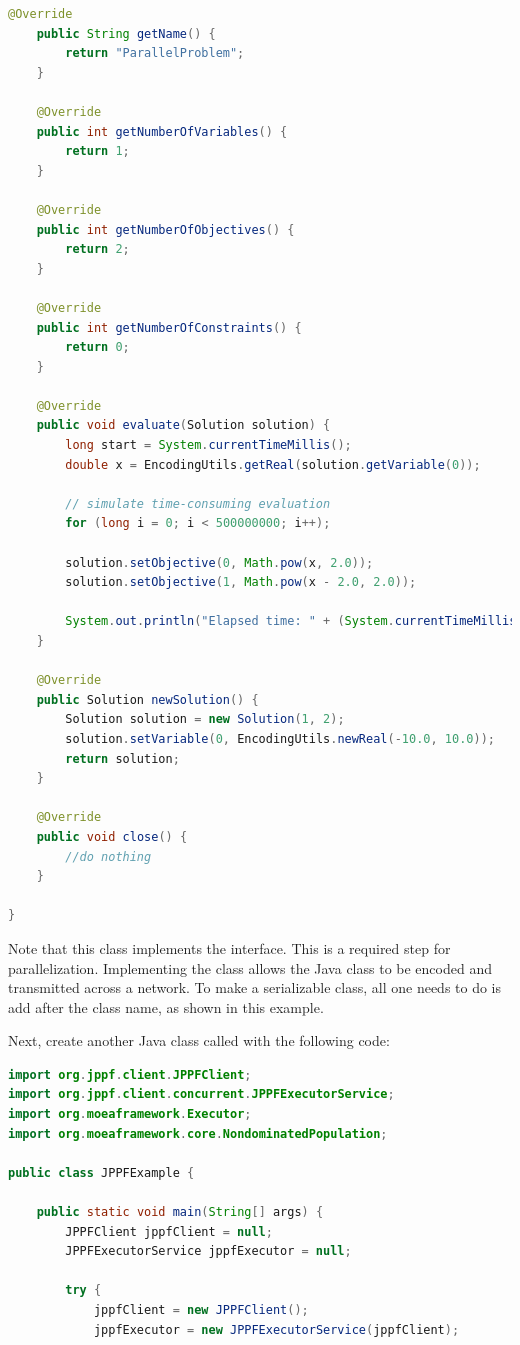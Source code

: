 {\begin{lstlisting}[language=Java]
	@Override
	public String getName() {
		return "ParallelProblem";
	}
	
	@Override
	public int getNumberOfVariables() {
		return 1;
	}

	@Override
	public int getNumberOfObjectives() {
		return 2;
	}
	
	@Override
	public int getNumberOfConstraints() {
		return 0;
	}

	@Override
	public void evaluate(Solution solution) {
		long start = System.currentTimeMillis();
		double x = EncodingUtils.getReal(solution.getVariable(0));
		
		// simulate time-consuming evaluation
		for (long i = 0; i < 500000000; i++);
		
		solution.setObjective(0, Math.pow(x, 2.0));
		solution.setObjective(1, Math.pow(x - 2.0, 2.0));
		
		System.out.println("Elapsed time: " + (System.currentTimeMillis() - start));
	}

	@Override
	public Solution newSolution() {
		Solution solution = new Solution(1, 2);
		solution.setVariable(0, EncodingUtils.newReal(-10.0, 10.0));
		return solution;
	}
	
	@Override
	public void close() {
		//do nothing
	}

}
\end{lstlisting}

Note that this class implements the  interface.  This is a required step for parallelization.  Implementing the  class allows the Java class to be encoded and transmitted across a network.  To make a serializable class, all one needs to do is add  after the class name, as shown in this example.

Next, create another Java class called  with the following code:

\begin{lstlisting}[language=Java]
import org.jppf.client.JPPFClient;
import org.jppf.client.concurrent.JPPFExecutorService;
import org.moeaframework.Executor;
import org.moeaframework.core.NondominatedPopulation;

public class JPPFExample {

	public static void main(String[] args) {
		JPPFClient jppfClient = null;
		JPPFExecutorService jppfExecutor = null;

		try {
			jppfClient = new JPPFClient();
			jppfExecutor = new JPPFExecutorService(jppfClient);
			

\end{lstlisting}}
